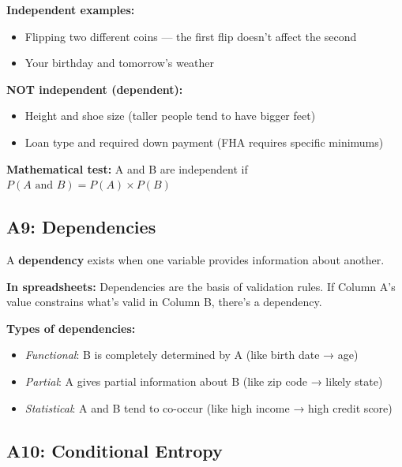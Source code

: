 \documentclass[11pt,a4paper]{article}
\begin{document}
\textbf{Independent examples:}
\begin{itemize}
    \item Flipping two different coins --- the first flip doesn't affect the second
    \item Your birthday and tomorrow's weather
\end{itemize}

\textbf{NOT independent (dependent):}
\begin{itemize}
    \item Height and shoe size (taller people tend to have bigger feet)
    \item Loan type and required down payment (FHA requires specific minimums)
\end{itemize}

\textbf{Mathematical test:} A and B are independent if $P(A \text{ and } B) = P(A) \times P(B)$

\subsection*{A9: Dependencies}
\label{A9}

A \textbf{dependency} exists when one variable provides information about another.

\textbf{In spreadsheets:} Dependencies are the basis of validation rules. If Column A's value constrains what's valid in Column B, there's a dependency.

\textbf{Types of dependencies:}
\begin{itemize}
    \item \textit{Functional}: B is completely determined by A (like birth date → age)
    \item \textit{Partial}: A gives partial information about B (like zip code → likely state)
    \item \textit{Statistical}: A and B tend to co-occur (like high income → high credit score)
\end{itemize}

\subsection*{A10: Conditional Entropy}
\label{A10}
\end{document}
